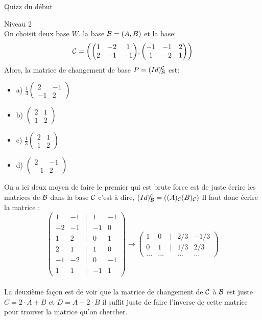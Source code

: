 \begin{parag}{Quizz du début}
\begin{subparag}{Niveau 2}
        \\
        On choisit deux base $W$. la base $\mathcal{B} = (A, B)$ et la base:
        \[\cmath = \left(\begin{pmatrix}
            1 & -2 & 1\\ 2 & -1 & -1
        \end{pmatrix}, \begin{pmatrix}
            -1 & -1 & 2 \\ 1 & -2 & 1
        \end{pmatrix}\right)\]
        Alors, la matrice de changement de base $P = (Id)_{\mathcal{B}}^{\mathcal{C}}$ est:
        \begin{itemize}
            \item a) $\frac{1}{3}\begin{pmatrix}
                2 & -1 \\ -1 & 2
            \end{pmatrix}$
            \item b) $\begin{pmatrix}
                2 & 1 \\ 1 & 2
            \end{pmatrix}$
            \item c) $\frac{1}{3} \begin{pmatrix}
                2 & 1 \\ 1 &  2
            \end{pmatrix}$
            \item d) $\begin{pmatrix}
                2 & -1 \\ -1 & 2
            \end{pmatrix}$
        \end{itemize}
        On a ici deux moyen de faire le premier qui est brute force est de juste écrire les matrices de $\mathcal{B}$ dans la base $\mathcal{C}$ c'est à dire, $(Id)_\bmath^\cmath = \left((A)_\cmath (B)_\cmath\right)$
        Il faut donc écrire la matrice :
        \[\begin{pmatrix}
            1 & -1 &| & 1 & -1 \\
            -2 & -1 &| & -1 & 0 \\
            1 & 2 &| & 0 & 1 \\
            2 & 1 &| & 1 & 0 \\
            -1 & -2 &| & 0 & -1 \\
            1 & 1 &| & -1 & 1 
        \end{pmatrix} \to \begin{pmatrix}
            1 & 0&| & 2/3 & -1/3\\
            0 & 1&|& 1/3 & 2/3\\
            ... & ...& & ... & ...
        \end{pmatrix}\]
        \\
        La deuxième façon est de voir que la matrice de changement de $\mathcal{C}$ à $\mathcal{B}$ est juste $C = 2\cdot A + B$ et $D = A + 2\cdot B$ il suffit juste de faire l'inverse de cette matrice pour trouver la matrice qu'on chercher.
    \end{subparag}
\end{parag}

